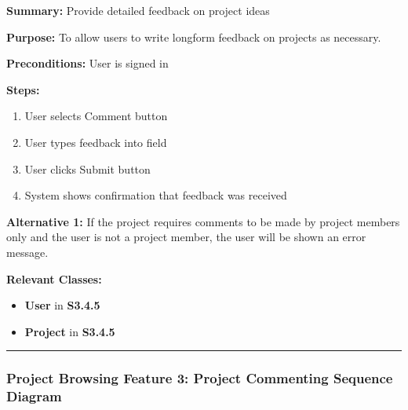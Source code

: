 \documentclass[twoside,letterpaper]{article}
\begin{document}
\noindent\textbf{Summary:} Provide detailed feedback on project ideas  \newline

\noindent\textbf{Purpose:} To allow users to write longform feedback on projects as necessary. \newline

\noindent\textbf{Preconditions:} User is signed in \newline

\noindent\textbf{Steps:} \begin{enumerate}
	\item User selects Comment button
	\item User types feedback into field
	\item User clicks Submit button
	\item System shows confirmation that feedback was received
\end{enumerate}
\noindent\textbf{Alternative 1:} If the project requires comments to be made by project members only and the user is not a project member, the user will be shown an error message. \newline


\noindent\textbf{Relevant Classes:}
\begin{itemize}
	\item \textbf{User} in \textbf{S3.4.5}
	\item \textbf{Project} in \textbf{S3.4.5}
\end{itemize}
\vspace{8pt}
\hrule
\newpage
\subsubsection[Project Browsing Feature 3: Project Commenting Sequence Diagram]{\rmfamily\bfseries\color{black}
	Project Browsing Feature 3: Project Commenting Sequence Diagram}
\hypertarget{RefHeading22059017292}{}

\bigskip
\end{document}
